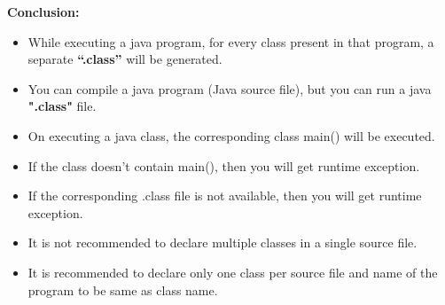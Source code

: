 \begin{flushleft}
	\textbf{Conclusion:}
	\begin{itemize}
		\item While executing a java program, for every class present in that program, a separate \textbf{“.class”} will be generated.
		\item You can compile a java program (Java source file), but you can run a java \textbf{".class"} file.
		\item On executing a java class, the corresponding class main() will be executed.
		\item If the class doesn’t contain main(), then you will get runtime exception.
		\item If the corresponding .class file is not available, then you will get runtime exception.
		\item It is not recommended to declare multiple classes in a single source file. 
		\item It is recommended to declare only one class per source file and name of the program to be same as class name.
	\end{itemize}
	
\end{flushleft}
\newpage



